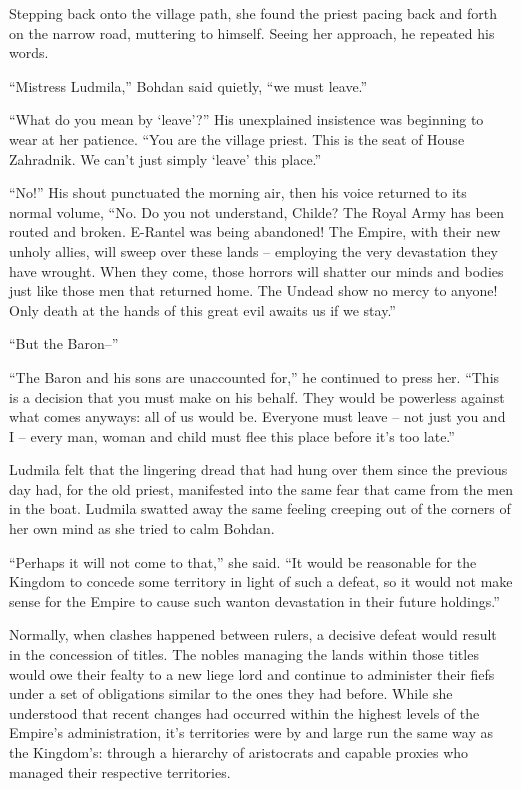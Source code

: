  

Stepping back onto the village path, she found the priest pacing back and forth on the narrow road, muttering to himself. Seeing her approach, he repeated his words.

 

“Mistress Ludmila,” Bohdan said quietly, “we must leave.”

 

“What do you mean by ‘leave’?” His unexplained insistence was beginning to wear at her patience. “You are the village priest. This is the seat of House Zahradnik. We can’t just simply ‘leave’ this place.”

 

“No!” His shout punctuated the morning air, then his voice returned to its normal volume, “No. Do you not understand, Childe? The Royal Army has been routed and broken. E-Rantel was being abandoned! The Empire, with their new unholy allies, will sweep over these lands – employing the very devastation they have wrought. When they come, those horrors will shatter our minds and bodies just like those men that returned home. The Undead show no mercy to anyone! Only death at the hands of this great evil awaits us if we stay.”

 

“But the Baron–”

 

“The Baron and his sons are unaccounted for,” he continued to press her. “This is a decision that you must make on his behalf. They would be powerless against what comes anyways: all of us would be. Everyone must leave – not just you and I – every man, woman and child must flee this place before it’s too late.”

 

Ludmila felt that the lingering dread that had hung over them since the previous day had, for the old priest, manifested into the same fear that came from the men in the boat. Ludmila swatted away the same feeling creeping out of the corners of her own mind as she tried to calm Bohdan.

 

“Perhaps it will not come to that,” she said. “It would be reasonable for the Kingdom to concede some territory in light of such a defeat, so it would not make sense for the Empire to cause such wanton devastation in their future holdings.”

 

Normally, when clashes happened between rulers, a decisive defeat would result in the concession of titles. The nobles managing the lands within those titles would owe their fealty to a new liege lord and continue to administer their fiefs under a set of obligations similar to the ones they had before. While she understood that recent changes had occurred within the highest levels of the Empire’s administration, it’s territories were by and large run the same way as the Kingdom’s: through a hierarchy of aristocrats and capable proxies who managed their respective territories.

